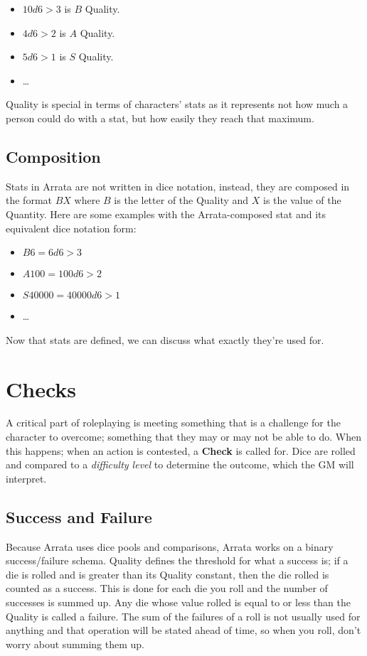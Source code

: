\documentclass[../main.tex]{subfiles}
\begin{document}
    \begin{itemize}
        \item $10d6>3$ is $B$ Quality.
        \item $4d6>2$ is $A$ Quality.
        \item $5d6>1$ is $S$ Quality.
        \item \dots
    \end{itemize}

    Quality is special in terms of characters' stats as it represents not how much a person could do with a stat, but how easily they reach that maximum.

    \subsection{Composition}

    Stats in Arrata are not written in dice notation, instead, they are composed in the format $BX$ where $B$ is the letter of the Quality and $X$ is the value of the Quantity. Here are some examples with the Arrata-composed stat and its equivalent dice notation form:

    \begin{itemize}
        \item $B6 = 6d6>3$
        \item $A100 = 100d6>2$
        \item $S40000 = 40000d6>1$
        \item \dots
    \end{itemize}

    Now that stats are defined, we can discuss what exactly they're used for.

    \section{Checks}

    A critical part of roleplaying is meeting something that is a challenge for the character to overcome; something that they may or may not be able to do. When this happens; when an action is contested, a \textbf{Check} is called for. Dice are rolled and compared to a {\em difficulty level} to determine the outcome, which the GM will interpret.

    \subsection{Success and Failure}

    Because Arrata uses dice pools and comparisons, Arrata works on a binary success/failure schema. Quality defines the threshold for what a success is; if a die is rolled and is greater than its Quality constant, then the die rolled is counted as a success. This is done for each die you roll and the number of successes is summed up. Any die whose value rolled is equal to or less than the Quality is called a failure. The sum of the failures of a roll is not usually used for anything and that operation will be stated ahead of time, so when you roll, don't worry about summing them up.
\end{document}
